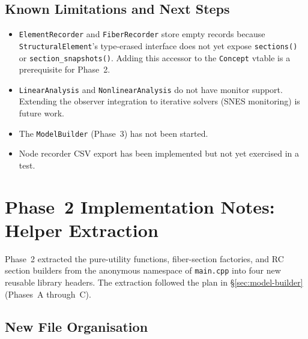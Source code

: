 \subsection{Known Limitations and Next Steps}
\label{sec:impl-limitations}

\begin{itemize}
  \item \texttt{ElementRecorder} and \texttt{FiberRecorder} store
        empty records because \texttt{StructuralElement}'s type-erased
        interface does not yet expose \texttt{sections()} or
        \texttt{section\_snapshots()}.  Adding this accessor to the
        \texttt{Concept} vtable is a prerequisite for Phase~2.
  \item \texttt{LinearAnalysis} and \texttt{NonlinearAnalysis} do not
        have monitor support.  Extending the observer integration to
        iterative solvers (SNES monitoring) is future work.
  \item The \texttt{ModelBuilder} (Phase~3) has not been started.
  \item Node recorder CSV export has been implemented but not yet
        exercised in a test.
\end{itemize}


\section{Phase~2 Implementation Notes: Helper Extraction}
\label{sec:phase2-implementation}

Phase~2 extracted the pure-utility functions, fiber-section factories,
and RC section builders from the anonymous namespace of
\texttt{main.cpp} into four new reusable library headers.
The extraction followed the plan in \S\ref{sec:model-builder}
(Phases~A through~C).

\subsection{New File Organisation}
\label{sec:phase2-files}

